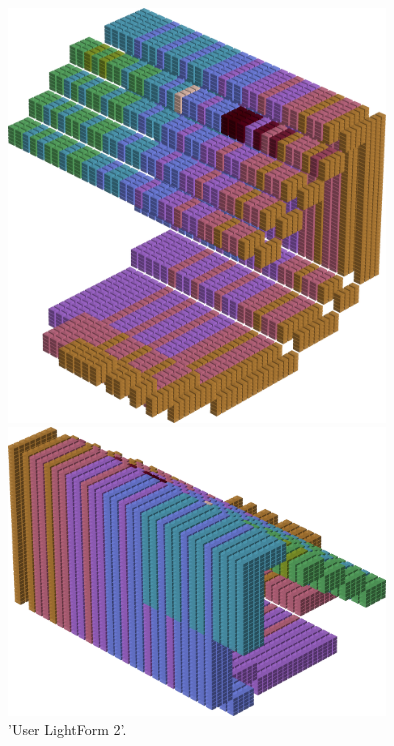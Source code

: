 \begin{minipage}[b]{0.48\linewidth}
\vspace{0.5cm}
\begin{figure}[H]
    \centering
    \begin{adjustbox}{width=4cm,margin=0cm 0cm}
      \includegraphics[width=10cm]{src/colorspace_patterns/pattern10-45.png}%
    \end{adjustbox}
    \begin{adjustbox}{width=5cm,margin=0cm 0cm}
      \includegraphics[width=10cm]{src/colorspace_patterns/pattern10-225.png}%
    \end{adjustbox}
\caption{'User LightForm 2'.}
\end{figure}
\end{minipage}
